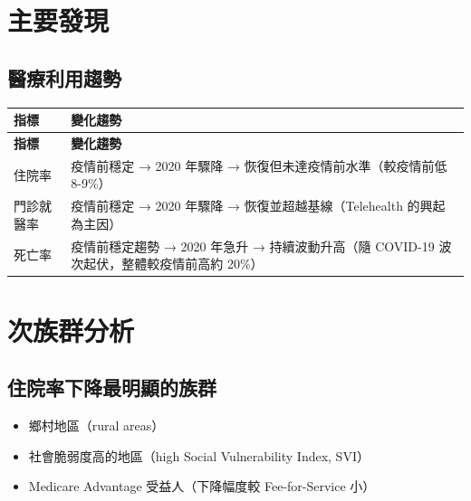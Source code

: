 \documentclass[12pt,a4paper]{article}
\begin{document}
\section{主要發現}


\subsection{醫療利用趨勢}

\begin{longtable}{p{3.5cm}p{10.5cm}}
\toprule
\textbf{指標} & \textbf{變化趨勢} \\
\midrule
\endfirsthead
\toprule
\textbf{指標} & \textbf{變化趨勢} \\
\midrule
\endhead
\bottomrule
\endfoot

住院率 & 疫情前穩定 → 2020 年驟降 → 恢復但未達疫情前水準\newline （較疫情前低 8-9\%） \\
\midrule
門診就醫率 & 疫情前穩定 → 2020 年驟降 → 恢復並超越基線\newline （Telehealth 的興起為主因） \\
\midrule
死亡率 & 疫情前穩定趨勢 → 2020 年急升 → 持續波動升高\newline （隨 COVID-19 波次起伏，整體較疫情前高約 20\%） \\
\bottomrule
\end{longtable}

\section{次族群分析}

\subsection{住院率下降最明顯的族群}
\begin{itemize}
    \item 鄉村地區（rural areas）
    \item 社會脆弱度高的地區（high Social Vulnerability Index, SVI）
    \item Medicare Advantage 受益人（下降幅度較 Fee-for-Service 小）
\end{itemize}
\end{document}
